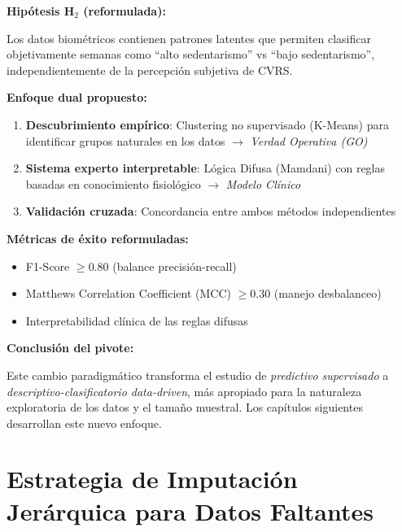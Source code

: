 \documentclass[12pt,letterpaper,twoside]{report}
\begin{document}
\begin{hipotesisbox}
\textbf{Hipótesis H$_2$ (reformulada):}

Los datos biométricos contienen patrones latentes que permiten clasificar objetivamente semanas como ``alto sedentarismo'' vs ``bajo sedentarismo'', independientemente de la percepción subjetiva de CVRS.

\textbf{Enfoque dual propuesto:}
\begin{enumerate}[noitemsep]
    \item \textbf{Descubrimiento empírico}: Clustering no supervisado (K-Means) para identificar grupos naturales en los datos $\to$ \textit{Verdad Operativa (GO)}
    \item \textbf{Sistema experto interpretable}: Lógica Difusa (Mamdani) con reglas basadas en conocimiento fisiológico $\to$ \textit{Modelo Clínico}
    \item \textbf{Validación cruzada}: Concordancia entre ambos métodos independientes
\end{enumerate}
\end{hipotesisbox}

\begin{estadisticobox}
\textbf{Métricas de éxito reformuladas:}

\begin{itemize}[noitemsep]
    \item F1-Score $\geq 0.80$ (balance precisión-recall)
    \item Matthews Correlation Coefficient (MCC) $\geq 0.30$ (manejo desbalanceo)
    \item Interpretabilidad clínica de las reglas difusas
\end{itemize}
\end{estadisticobox}

\begin{conclusionbox}
\textbf{Conclusión del pivote:}

Este cambio paradigmático transforma el estudio de \textit{predictivo supervisado} a \textit{descriptivo-clasificatorio data-driven}, más apropiado para la naturaleza exploratoria de los datos y el tamaño muestral. Los capítulos siguientes desarrollan este nuevo enfoque.
\end{conclusionbox}

\chapter{Estrategia de Imputación Jerárquica para Datos Faltantes}
\end{document}

